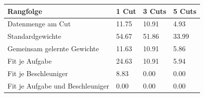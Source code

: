 \begin{tabular}{@{}llll@{}}
\toprule
Rangfolge & 1 Cut & 3 Cuts & 5 Cuts \\
\midrule
Datenmenge am Cut & 11.75 & 10.91 & 4.93 \\
Standardgewichte & 54.67 & 51.86 & 33.99 \\
Gemeinsam gelernte Gewichte & 11.63 & 10.91 & 5.86 \\
Fit je Aufgabe & 24.63 & 10.91 & 5.94 \\
Fit je Beschleuniger & 8.83 & 0.00 & 0.00 \\
Fit je Aufgabe und Beschleuniger & 0.00 & 0.00 & 0.00 \\
\bottomrule
\end{tabular}
